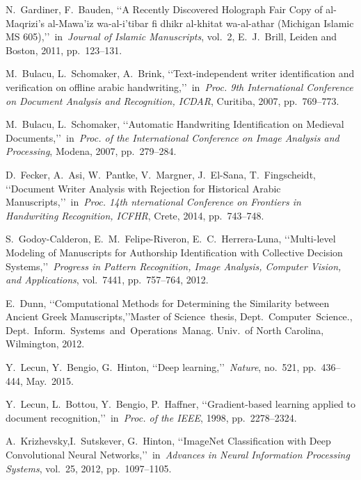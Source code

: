 \documentclass[conference,a4paper]{ieeetran}
\begin{document}
 \begin{thebibliography}{99}

 N.~Gardiner, F.~Bauden, \lq\lq A Recently Discovered Holograph Fair Copy of al-Maqrizi's al-Mawa'iz wa-al-i'tibar fi dhikr al-khitat wa-al-athar (Michigan Islamic MS 605),\rq\rq~in~\emph{Journal of Islamic Manuscripts}, vol.~2, E.~J.~Brill, Leiden and Boston, 2011, pp.~123--131.

 M.~Bulacu, L.~Schomaker, A.~Brink, \lq\lq Text-independent writer identification and verification on offline arabic handwriting,\rq\rq~in~\emph{Proc. 9th International Conference on Document Analysis and Recognition, ICDAR}, Curitiba, 2007, pp.~769--773.

 M.~Bulacu, L.~Schomaker, \lq\lq Automatic Handwriting Identification on Medieval Documents,\rq\rq~in~\emph{Proc. of the International Conference on Image Analysis and Processing}, Modena, 2007, pp.~279--284.

 D.~Fecker, A.~Asi, W.~Pantke, V.~Margner, J.~El-Sana, T.~Fingscheidt, \lq\lq Document Writer Analysis with Rejection for Historical Arabic Manuscripts,\rq\rq~in~\emph{Proc. 14th nternational Conference on Frontiers in Handwriting Recognition, ICFHR}, Crete, 2014, pp.~743--748.

 S.~Godoy-Calderon, E.~M.~Felipe-Riveron, E.~C.~Herrera-Luna, \lq\lq Multi-level Modeling of Manuscripts for Authorship Identification with Collective Decision Systems,\rq\rq~\emph{Progress in Pattern Recognition, Image Analysis, Computer Vision, and Applications}, vol.~7441, pp.~757--764, 2012.

 E.~Dunn, \lq\lq Computational Methods for Determining the Similarity between Ancient Greek Manuscripts,\rq\rq Master of Science~thesis, Dept.~Computer~Science., Dept.~Inform.~Systems~and~Operations~Manag. Univ.~of North Carolina, Wilmington, 2012.

 Y.~Lecun, Y.~Bengio, G.~Hinton, \lq\lq Deep learning,\rq\rq~\emph{Nature}, no.~521, pp.~436--444, May.~2015.

 Y.~Lecun, L.~Bottou, Y.~Bengio, P.~Haffner, \lq\lq Gradient-based learning applied to document recognition,\rq\rq~in~\emph{Proc. of the IEEE}, 1998, pp.~2278--2324.

 A.~Krizhevsky,I.~Sutskever, G.~Hinton, \lq\lq ImageNet Classification with Deep Convolutional Neural Networks,\rq\rq~in~\emph{Advances in Neural Information Processing Systems}, vol.~25, 2012, pp.~1097--1105.


\end{thebibliography}
\end{document}
